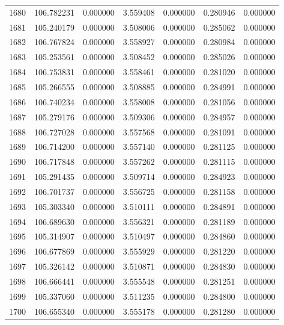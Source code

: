 \begin{tabular}{rrrrrrr}
1680 & 106.782231 &    0.000000 &  3.559408 &   0.000000 &   0.280946 &  0.000000 \\
1681 & 105.240179 &    0.000000 &  3.508006 &   0.000000 &   0.285062 &  0.000000 \\
1682 & 106.767824 &    0.000000 &  3.558927 &   0.000000 &   0.280984 &  0.000000 \\
1683 & 105.253561 &    0.000000 &  3.508452 &   0.000000 &   0.285026 &  0.000000 \\
1684 & 106.753831 &    0.000000 &  3.558461 &   0.000000 &   0.281020 &  0.000000 \\
1685 & 105.266555 &    0.000000 &  3.508885 &   0.000000 &   0.284991 &  0.000000 \\
1686 & 106.740234 &    0.000000 &  3.558008 &   0.000000 &   0.281056 &  0.000000 \\
1687 & 105.279176 &    0.000000 &  3.509306 &   0.000000 &   0.284957 &  0.000000 \\
1688 & 106.727028 &    0.000000 &  3.557568 &   0.000000 &   0.281091 &  0.000000 \\
1689 & 106.714200 &    0.000000 &  3.557140 &   0.000000 &   0.281125 &  0.000000 \\
1690 & 106.717848 &    0.000000 &  3.557262 &   0.000000 &   0.281115 &  0.000000 \\
1691 & 105.291435 &    0.000000 &  3.509714 &   0.000000 &   0.284923 &  0.000000 \\
1692 & 106.701737 &    0.000000 &  3.556725 &   0.000000 &   0.281158 &  0.000000 \\
1693 & 105.303340 &    0.000000 &  3.510111 &   0.000000 &   0.284891 &  0.000000 \\
1694 & 106.689630 &    0.000000 &  3.556321 &   0.000000 &   0.281189 &  0.000000 \\
1695 & 105.314907 &    0.000000 &  3.510497 &   0.000000 &   0.284860 &  0.000000 \\
1696 & 106.677869 &    0.000000 &  3.555929 &   0.000000 &   0.281220 &  0.000000 \\
1697 & 105.326142 &    0.000000 &  3.510871 &   0.000000 &   0.284830 &  0.000000 \\
1698 & 106.666441 &    0.000000 &  3.555548 &   0.000000 &   0.281251 &  0.000000 \\
1699 & 105.337060 &    0.000000 &  3.511235 &   0.000000 &   0.284800 &  0.000000 \\
1700 & 106.655340 &    0.000000 &  3.555178 &   0.000000 &   0.281280 &  0.000000 \\

\end{tabular}
